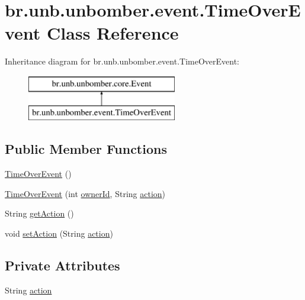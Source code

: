 \hypertarget{classbr_1_1unb_1_1unbomber_1_1event_1_1_time_over_event}{\section{br.\+unb.\+unbomber.\+event.\+Time\+Over\+Event Class Reference}
\label{classbr_1_1unb_1_1unbomber_1_1event_1_1_time_over_event}
}
Inheritance diagram for br.\+unb.\+unbomber.\+event.\+Time\+Over\+Event\+:\begin{figure}[H]
\begin{center}
\leavevmode
\includegraphics[height=2.000000cm]{classbr_1_1unb_1_1unbomber_1_1event_1_1_time_over_event}
\end{center}
\end{figure}
\subsection*{Public Member Functions}
\begin{DoxyCompactItemize}
\item 
\hyperlink{classbr_1_1unb_1_1unbomber_1_1event_1_1_time_over_event_a6d0ff275c61c512d0ca01993c1a472da}{Time\+Over\+Event} ()
\item 
\hyperlink{classbr_1_1unb_1_1unbomber_1_1event_1_1_time_over_event_a7c52cdf1285695881a58e0f9ebb6a15a}{Time\+Over\+Event} (int \hyperlink{classbr_1_1unb_1_1unbomber_1_1core_1_1_event_afd44621bcd3e242d33eaad558310bedd}{owner\+Id}, String \hyperlink{classbr_1_1unb_1_1unbomber_1_1event_1_1_time_over_event_ab71c15862facb3733163388b294a3f45}{action})
\item 
String \hyperlink{classbr_1_1unb_1_1unbomber_1_1event_1_1_time_over_event_ac6775d5e66789d74e25d00c85d3bd7bf}{get\+Action} ()
\item 
void \hyperlink{classbr_1_1unb_1_1unbomber_1_1event_1_1_time_over_event_abbf534eaf4b2514b043e14f1bc66132f}{set\+Action} (String \hyperlink{classbr_1_1unb_1_1unbomber_1_1event_1_1_time_over_event_ab71c15862facb3733163388b294a3f45}{action})
\end{DoxyCompactItemize}
\subsection*{Private Attributes}
\begin{DoxyCompactItemize}
\item 
String \hyperlink{classbr_1_1unb_1_1unbomber_1_1event_1_1_time_over_event_ab71c15862facb3733163388b294a3f45}{action}
\end{DoxyCompactItemize}


